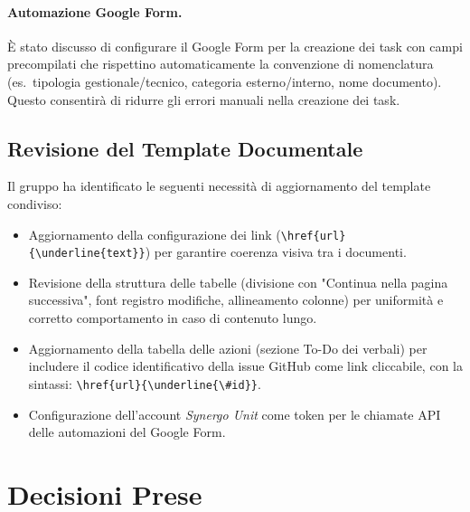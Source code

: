 \paragraph{Automazione Google Form.}
È stato discusso di configurare il Google Form per la creazione dei task con
campi precompilati che rispettino automaticamente la convenzione di nomenclatura
(es.\ tipologia gestionale/tecnico, categoria esterno/interno, nome documento).
Questo consentirà di ridurre gli errori manuali nella creazione dei task.
 
\subsection{Revisione del Template Documentale}
 
Il gruppo ha identificato le seguenti necessità di aggiornamento del template
condiviso:
 
\begin{itemize}
	\item Aggiornamento della configurazione dei link (\verb|\href{url}{\underline{text}}|)
	      per garantire coerenza visiva tra i documenti.
	\item Revisione della struttura delle tabelle (divisione con "Continua nella pagina successiva", font registro modifiche,
	      allineamento colonne) per uniformità e corretto comportamento in
	      caso di contenuto lungo.
	\item Aggiornamento della tabella delle azioni (sezione To-Do dei verbali)
	      per includere il codice identificativo della issue GitHub come link
	      cliccabile, con la sintassi: 		  
	      \verb|\href{url}{\underline{\#id}}|.
	\item Configurazione dell'account \textit{Synergo Unit} come token per
	      le chiamate API delle automazioni del Google Form.
\end{itemize}

\newpage

\section{Decisioni Prese}

